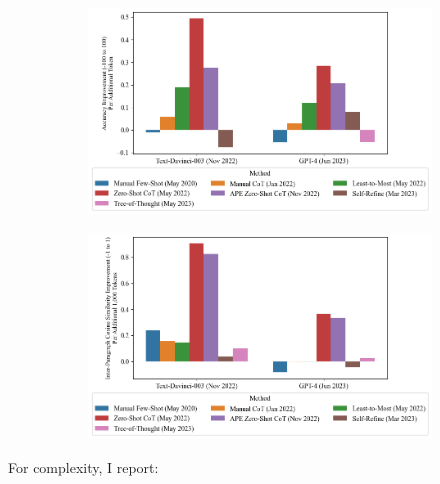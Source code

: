 \documentclass[11pt]{article}
\begin{document}
\begin{figure}[h]
  \caption{Gains v. Direct Prompting}
  \begin{subfigure}[h]{0.4925\textwidth}
      \centering
      \includegraphics[width=0.95\hsize]{../Output/gsm8k_change_in_accuracy_quality_per_change_in_conversation_length_sorted_by_technique_age.png} 
  \end{subfigure}
  \begin{subfigure}[h]{0.4925\textwidth}
      \centering
      \includegraphics[width=0.95\hsize]{../Output/cw_change_in_accuracy_quality_per_change_in_conversation_length_sorted_by_technique_age_transformed.png}
  \end{subfigure}
  \hfill
\end{figure}

\twocolumn

For complexity, I report:
\end{document}
